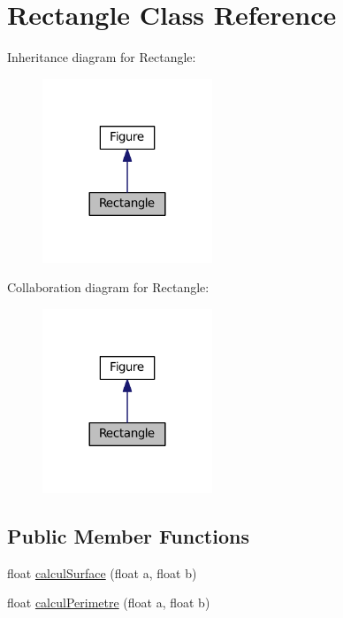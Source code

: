\hypertarget{classRectangle}{}\section{Rectangle Class Reference}
\label{classRectangle}


Inheritance diagram for Rectangle\+:
\nopagebreak
\begin{figure}[H]
\begin{center}
\leavevmode
\includegraphics[width=144pt]{classRectangle__inherit__graph}
\end{center}
\end{figure}


Collaboration diagram for Rectangle\+:
\nopagebreak
\begin{figure}[H]
\begin{center}
\leavevmode
\includegraphics[width=144pt]{classRectangle__coll__graph}
\end{center}
\end{figure}
\subsection*{Public Member Functions}
\begin{DoxyCompactItemize}
\item 
float \hyperlink{classRectangle_a2931c93ead4aa6ac3e337de151dcd49c}{calcul\+Surface} (float a, float b)
\item 
float \hyperlink{classRectangle_aa90f2be32fb070a870405842ec55c1be}{calcul\+Perimetre} (float a, float b)
\end{DoxyCompactItemize}
